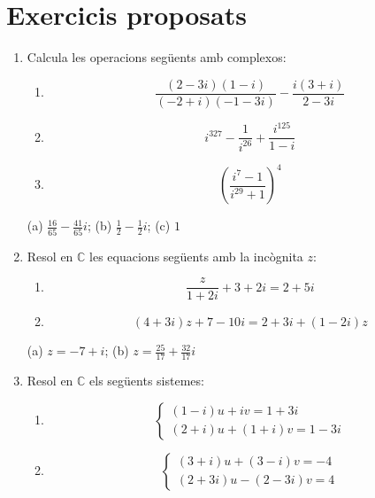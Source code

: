 \chapter{Exercicis proposats}
\label{cap:exercicis}
\begin{enumerate}
\item Calcula les operacions següents amb complexos:

\begin{enumerate}
\item[a)]
\[
\frac{(2-3i)(1-i)}{(-2+i)(-1-3i)}-\frac{i(3+i)}{2-3i}
\]

\item[b)]
\[
i^{327}-\frac{1}{i^{26}}+\frac{i^{125}}{1-i}
\]

\item[c)]
\[
\left( \frac{i^{7}-1}{i^{29}+1}\right) ^{4}
\]
\end{enumerate}

\begin{indicacio}
(a) $\frac{16}{65}-\frac{41}{65}i$; (b) $\frac{1}{2}-\frac{1}{2
}i$; (c) $1$
\end{indicacio}

\item Resol en $\mathbb{C}$ les equacions següents amb la incògnita $z$:

\begin{enumerate}
\item[a)]
\[
\frac{z}{1+2i}+3+2i=2+5i
\]

\item[b)]
\[
(4+3i)z+7-10i=2+3i+(1-2i)z
\]
\end{enumerate}

\begin{indicacio}
(a) $z=-7+i$; (b) $z=\frac{25}{17}+\frac{32}{17}i$
\end{indicacio}

\item Resol en $\mathbb{C}$ els següents sistemes:

\begin{enumerate}
\item[a)]
\[
\left\{
\begin{array}{l}
(1-i)u+iv=1+3i \\
(2+i)u+(1+i)v=1-3i
\end{array}
\right.
\]

\item[b)]
\[
\left\{
\begin{array}{l}
(3+i)u+(3-i)v=-4 \\
(2+3i)u-(2-3i)v=4
\end{array}
\right.
\]
\end{enumerate}


\end{enumerate}
